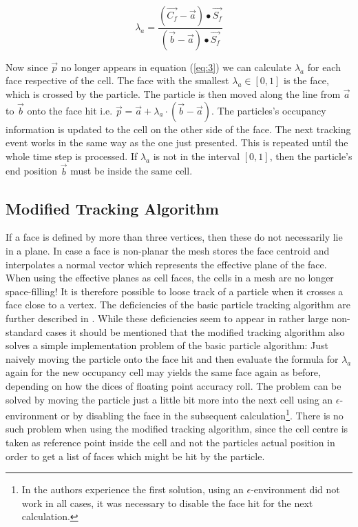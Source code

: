 \begin{equation}
  \label{eq:3}
  \lambda_{a} = \frac{(\vec{C_f} - \vec{a}) \bullet \vec{S_f}}
                       {(\vec{b} - \vec{a}) \bullet \vec{S_f}}
\end{equation}

Now since $\vec{p}$ no longer appears in equation (\ref{eq:3}) we can calculate $\lambda_{a}$ for each face respective of the cell. The face with the smallest $\lambda_{a} \in [0, 1]$ is the face, which is crossed by the particle. The particle is then moved along the line from $\vec{a}$ to $\vec{b}$ onto the face hit i.e. $\vec{p} = \vec{a} + \lambda_a \cdot (\vec{b} - \vec{a})$. The particles's occupancy information is updated to the cell on the other side of the face. The next tracking event works in the same way as the one just presented. This is repeated until the whole time step is processed. If $\lambda_{a}$ is not in the interval $[0,1]$, then the particle's end position $\vec{b}$ must be inside the same cell.

\subsection{Modified Tracking Algorithm}

If a face is defined by more than three vertices, then these do not necessarily lie in a plane. In case a face is non-planar the mesh stores the face centroid and interpolates a normal vector which represents the effective plane of the face. When using the effective planes as cell faces, the cells in a mesh are no longer space-filling! It is therefore possible to loose track of a particle when it crosses a face close to a vertex. The deficiencies of the basic particle tracking algorithm are further described in \cite[page 267]{macpherson08}.  While these deficiencies seem to appear in rather large non-standard cases it should be mentioned that the modified tracking algorithm also solves a simple implementation problem of the basic particle algorithm: Just naively moving the particle onto the face hit and then evaluate the formula for $\lambda_a$ again for the new occupancy cell may yields the same face again as before, depending on how the dices of floating point accuracy roll. The problem can be solved by moving the particle just a little bit more into the next cell using an $\epsilon$-environment or by disabling the face in the subsequent calculation\footnote{In the authors experience the first solution, using an $\epsilon$-environment did not work in all cases, it was necessary to disable the face hit for the next calculation.}. There is no such problem when using the modified tracking algorithm, since the cell centre is taken as reference point inside the cell and not the particles actual position in order to get a list of faces which might be hit by the particle.


